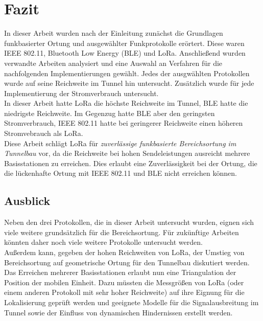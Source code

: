 \chapter{Fazit}
\label{ch:Fazit}
In dieser Arbeit wurden nach der Einleitung zunächst die Grundlagen funkbasierter Ortung und ausgewählter Funkprotokolle erörtert.
Diese waren IEEE 802.11, Bluetooth Low Energy (BLE) und LoRa.
Anschließend wurden verwandte Arbeiten analysiert und eine Auswahl an Verfahren für die nachfolgenden Implementierungen gewählt.
Jedes der ausgwählten Protokollen wurde auf seine Reichweite im Tunnel hin untersucht.
Zusätzlich wurde für jede Implementierung der Stromverbrauch untersucht.\\
In dieser Arbeit hatte LoRa die höchste Reichweite im Tunnel, BLE hatte die niedrigste Reichweite.
Im Gegenzug hatte BLE aber den geringsten Stromverbrauch, IEEE 802.11 hatte bei geringerer Reichweite einen höheren Stromvebrauch als LoRa.\\
Diese Arbeit schlägt LoRa für \emph{zuverlässige funkbasierte Bereichsortung im Tunnelbau} vor, da die Reichweite bei hohen Sendeleistungen ausreicht mehrere Basisstationen zu erreichen. 
Dies erlaubt eine Zuverlässigkeit bei der Ortung, die die lückenhafte Ortung mit IEEE 802.11 und BLE nicht erreichen können.

\section{Ausblick}
Neben den drei Protokollen, die in dieser Arbeit untersucht wurden, eignen sich viele weitere grundsätzlich für die Bereichsortung.
Für zukünftige Arbeiten könnten daher noch viele weitere Protokolle untersucht werden. \\
Außerdem kann, gegeben der hohen Reichweiten von LoRa, der Umstieg von Bereichsortung auf geometrische Ortung für den Tunnelbau diskutiert werden. 
Das Erreichen mehrerer Basisstationen erlaubt nun eine Triangulation der Position der mobilen Einheit.
Dazu müssten die Messgrößen von LoRa (oder einem anderen Protokoll mit sehr hoher Reichweite) auf ihre Eignung für die Lokalisierung geprüft werden und geeignete Modelle für die Signalausbreitung im Tunnel sowie der Einfluss von dynamischen Hindernissen erstellt werden.

